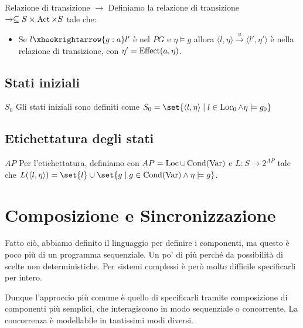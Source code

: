 \begin{definition}{Relazione di transizione \(\xrightarrow{}\)}
  Definiamo la relazione di transizione \(\xrightarrow{} \subseteq S \times \operatorname{Act} \times S\) tale che:
  \begin{itemize}
    \item Se \(l \xhookrightarrow{g:a} l' \) è nel \(PG\) e \(\eta \models g\) allora \(\langle l,\eta \rangle \xrightarrow{a} \langle l',\eta' \rangle\) è nella relazione di transizione, con \(\eta' = \operatorname{Effect}(a,\eta)\).
  \end{itemize}
\end{definition}

\subsection{Stati iniziali}

\begin{definition}{\(S_0\)}
  Gli stati iniziali sono definiti come \(S_0 = \set{\langle l, \eta \rangle \mid l \in \Loc_0 \land \eta \models g_0}\)
\end{definition}

\subsection{Etichettatura degli stati}

\begin{definition}{\(AP\)}
  Per l'etichettatura, definiamo con \(AP = \operatorname{Loc} \cup \operatorname{Cond}(\operatorname{Var})\) e \(L : S \to 2^{AP}\) tale che \(L(\langle l,\eta\rangle) = \set{l} \cup \set{g \mid g \in \Cond(\Var) \land {\eta \models g}}\).
\end{definition}

\section{Composizione e Sincronizzazione}

Fatto ciò, abbiamo definito il linguaggio per definire i componenti, ma questo è poco più di un programma sequenziale. Un po' di più perché da possibilità di scelte non deterministiche.
Per sistemi complessi è però molto difficile specificarli per intero.

Dunque l'approccio più comune è quello di specificarli tramite composizione di componenti più semplici, che interagiscono in modo sequenziale o concorrente.
La concorrenza è modellabile in tantissimi modi diversi.


